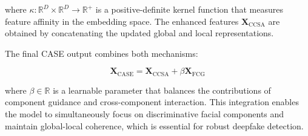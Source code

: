 where $\kappa: \mathbb{R}^D \times \mathbb{R}^D \rightarrow \mathbb{R}^+$ is a positive-definite kernel function that measures feature affinity in the embedding space. The enhanced features $\mathbf{X}_{\text{CCSA}}$ are obtained by concatenating the updated global and local representations.

The final CASE output combines both mechanisms:

\begin{equation}
\mathbf{X}_{\text{CASE}} = \mathbf{X}_{\text{CCSA}} + \beta \mathbf{X}_{\text{FCG}}
\end{equation}

where $\beta \in \mathbb{R}$ is a learnable parameter that balances the contributions of component guidance and cross-component interaction. This integration enables the model to simultaneously focus on discriminative facial components and maintain global-local coherence, which is essential for robust deepfake detection.
